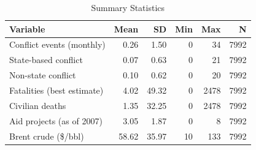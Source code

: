 \begin{table}[ht]
\centering
\begin{tabular}{lrrrrr}
  \toprule
Variable & Mean & SD & Min & Max & N \\ 
  \midrule
Conflict events (monthly) & 0.26 & 1.50 & 0 & 34 & 7992 \\ 
  State-based conflict & 0.07 & 0.63 & 0 & 21 & 7992 \\ 
  Non-state conflict & 0.10 & 0.62 & 0 & 20 & 7992 \\ 
  Fatalities (best estimate) & 4.02 & 49.32 & 0 & 2478 & 7992 \\ 
  Civilian deaths & 1.35 & 32.25 & 0 & 2478 & 7992 \\ 
  Aid projects (as of 2007) & 3.05 & 1.87 & 0 & 8 & 7992 \\ 
  Brent crude (\$/bbl) & 58.62 & 35.97 & 10 & 133 & 7992 \\ 
   \bottomrule
\end{tabular}
\caption{Summary Statistics} 
\label{tab:sumstats}
\end{table}
